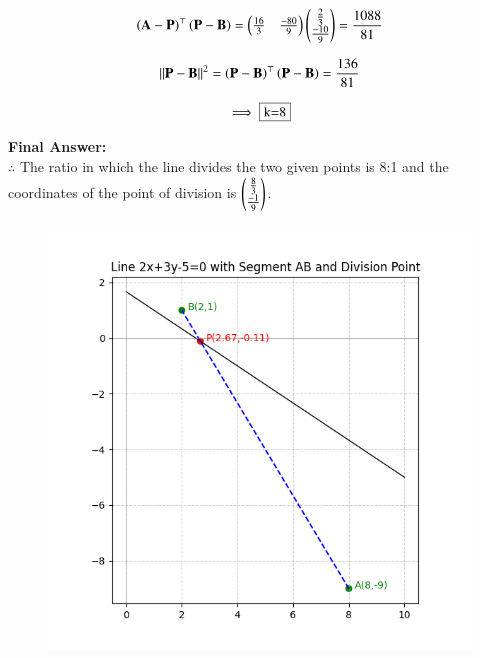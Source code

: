 \documentclass[journal,12pt,onecolumn]{IEEEtran}
\theoremstyle{remark}
\begin{document}
\begin{equation}
    \left({\mathbf{A}-\mathbf{P}}\right)^{\top}\left(\mathbf{P}-\mathbf{B}\right) = \begin{pmatrix}\frac{16}{3}&\frac{-80}{9}\end{pmatrix}\begin{pmatrix}\frac{2}{3}\\ \frac{-10}{9}\end{pmatrix} = \frac{1088}{81}
\end{equation}

\begin{equation}
    {\left\lVert\mathbf{P}-\mathbf{B}\right\rVert}^2 = \left(\mathbf{P}-\mathbf{B}\right)^{\top}\left(\mathbf{P}-\mathbf{B}\right) = \frac{136}{81}
\end{equation}

\begin{equation}
    \implies \fbox{k=8}
\end{equation}

\textbf{Final Answer: }\\
$\therefore$ The ratio in which the line divides the two given points is 8:1 and the coordinates of the point of division is $\begin{pmatrix}\frac{8}{3}\\ \frac{-1}{9}\end{pmatrix}$.

\begin{figure}[H]
    \centering
    \includegraphics[width=0.72\columnwidth]{figs/2.png}
    \caption{}
    \label{fig:placeholder}
\end{figure}
\end{document}
